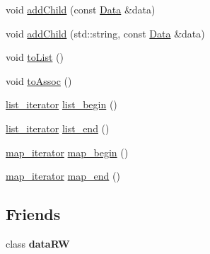 \begin{DoxyCompactItemize}
void \hyperlink{classklop_1_1Data_a4b5a9f41274ce996455123a8a708c6c5}{addChild} (const \hyperlink{classklop_1_1Data}{Data} \&data)
\item 
void \hyperlink{classklop_1_1Data_ada55852e13a3cff79b078bd8ee13d050}{addChild} (std::string, const \hyperlink{classklop_1_1Data}{Data} \&data)
\item 
void \hyperlink{classklop_1_1Data_ae7a3793820ae499d010cf7dafcea3a66}{toList} ()
\item 
void \hyperlink{classklop_1_1Data_a4a8acdc0100edfdaa90612ad1745c2ee}{toAssoc} ()
\item 
\hyperlink{classklop_1_1Data_a8bcb1ee1639616047953b2459319ea3c}{list\_\-iterator} \hyperlink{classklop_1_1Data_a1f315f65d1aa487da0d41ce7036013ed}{list\_\-begin} ()
\item 
\hyperlink{classklop_1_1Data_a8bcb1ee1639616047953b2459319ea3c}{list\_\-iterator} \hyperlink{classklop_1_1Data_af807d06d9aa338e2831b7cd1e254ea51}{list\_\-end} ()
\item 
\hyperlink{classklop_1_1Data_ae1c3cec24a9d3a5cd53693f5d34195f2}{map\_\-iterator} \hyperlink{classklop_1_1Data_aeb6daca6708978a23903d5200293b915}{map\_\-begin} ()
\item 
\hyperlink{classklop_1_1Data_ae1c3cec24a9d3a5cd53693f5d34195f2}{map\_\-iterator} \hyperlink{classklop_1_1Data_abfe383165bdecf91c2e88f766f62e1d1}{map\_\-end} ()
\end{DoxyCompactItemize}
\subsection*{Friends}
\begin{DoxyCompactItemize}
\item 
\hypertarget{classklop_1_1Data_ad02dbbe8a693b53850cb0cf2eda868da}{
class {\bfseries dataRW}}
\label{classklop_1_1Data_ad02dbbe8a693b53850cb0cf2eda868da}

\end{DoxyCompactItemize}


